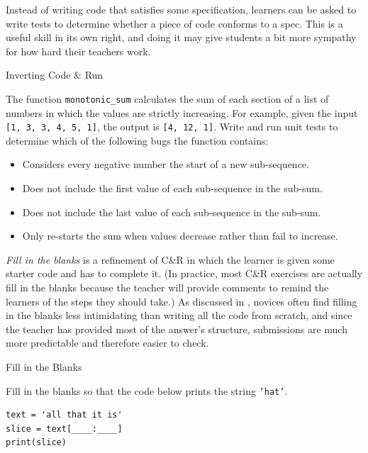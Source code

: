 Instead of writing code that satisfies some specification, learners
can be asked to write tests to determine whether a piece of code
conforms to a spec.  This is a useful skill in its own right, and
doing it may give students a bit more sympathy for how hard their
teachers work.

\begin{callout}{Inverting Code \& Run}

  The function \texttt{monotonic\_sum} calculates the sum of each
  section of a list of numbers in which the values are strictly
  increasing. For example, given the input
  \texttt{{[}1, 3, 3, 4, 5, 1{]}}, the output is
  \texttt{{[}4, 12, 1{]}}. Write and run unit tests to determine
  which of the following bugs the function contains:

  \begin{itemize}
  \item
    Considers every negative number the start of a new sub-sequence.
  \item
    Does not include the first value of each sub-sequence in the
    sub-sum.
  \item
    Does not include the last value of each sub-sequence in the
    sub-sum.
  \item
    Only re-starts the sum when values decrease rather than fail to
    increase.
\end{itemize}

\end{callout}

\emph{Fill in the blanks} is a refinement of C\&R in which the learner
is given some starter code and has to complete it. (In practice, most
C\&R exercises are actually fill in the blanks because the teacher
will provide comments to remind the learners of the steps they should
take.) As discussed in , novices often find filling in
the blanks less intimidating than writing all the code from scratch,
and since the teacher has provided most of the answer's structure,
submissions are much more predictable and therefore easier to check.

\begin{callout}{Fill in the Blanks}

  Fill in the blanks so that the code below prints the string
  \texttt{'hat'}.

\begin{verbatim}
text = 'all that it is'
slice = text[____:____]
print(slice)
\end{verbatim}

\end{callout}

